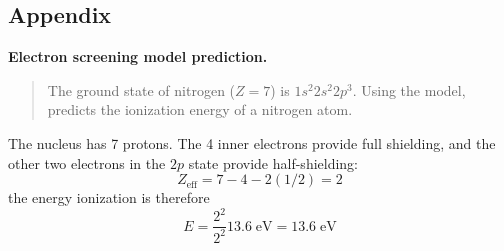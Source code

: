 \documentclass[../../../main.tex]{subfiles}
\begin{document}
\subsection{Appendix}
\textbf{Electron screening model prediction.} 
\begin{quote}
    The ground state of nitrogen ($Z = 7$) is $1s^2 2s^2 2p^3$. Using the model, predicts the ionization energy of a nitrogen atom.
\end{quote}
The nucleus has 7 protons. The 4 inner electrons provide full shielding, and the other two electrons in the $2p$ state provide half-shielding:
\begin{equation*}
    Z_{\text{eff}}=7-4-2(1/2)=2
\end{equation*}
the energy ionization is therefore
\begin{equation*}
    E=\frac{2^2}{2^2}13.6\;\text{eV}=13.6\;\text{eV}
\end{equation*}
\end{document}
